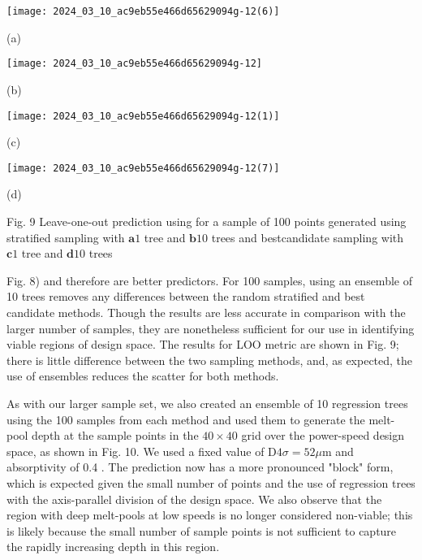 \documentclass[10pt]{article}
\begin{document}
\begin{center}
\texttt{[image: 2024\_03\_10\_ac9eb55e466d65629094g-12(6)]}
\end{center}

(a)

\begin{center}
\texttt{[image: 2024\_03\_10\_ac9eb55e466d65629094g-12]}
\end{center}

(b)

\begin{center}
\texttt{[image: 2024\_03\_10\_ac9eb55e466d65629094g-12(1)]}
\end{center}

(c)

\begin{center}
\texttt{[image: 2024\_03\_10\_ac9eb55e466d65629094g-12(7)]}
\end{center}

(d)

Fig. 9 Leave-one-out prediction using for a sample of 100 points generated using stratified sampling with $\mathbf{a} 1$ tree and $\mathbf{b} 10$ trees and bestcandidate sampling with $\mathbf{c} 1$ tree and $\mathbf{d} 10$ trees

Fig. 8) and therefore are better predictors. For 100 samples, using an ensemble of 10 trees removes any differences between the random stratified and best candidate methods. Though the results are less accurate in comparison with the larger number of samples, they are nonetheless sufficient for our use in identifying viable regions of design space. The results for LOO metric are shown in Fig. 9; there is little difference between the two sampling methods, and, as expected, the use of ensembles reduces the scatter for both methods.

As with our larger sample set, we also created an ensemble of 10 regression trees using the 100 samples from each method and used them to generate the melt-pool depth at the sample points in the $40 \times 40$ grid over the power-speed design space, as shown in Fig. 10. We used a fixed value of $\mathrm{D} 4 \sigma=52 \mu \mathrm{m}$ and absorptivity of 0.4 . The prediction now has a more pronounced "block" form, which is expected given the small number of points and the use of regression trees with the axis-parallel division of the design space. We also observe that the region with deep melt-pools at low speeds is no longer considered non-viable; this is likely because the small number of sample points is not sufficient to capture the rapidly increasing depth in this region.
\end{document}
